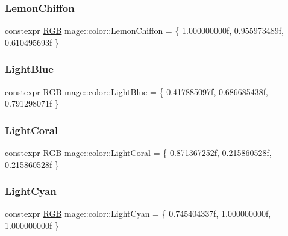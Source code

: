 \subsubsection{\texorpdfstring{Lemon\+Chiffon}{LemonChiffon}}
{\footnotesize\ttfamily constexpr \hyperlink{structmage_1_1_r_g_b}{R\+GB} mage\+::color\+::\+Lemon\+Chiffon = \{ 1.\+000000000f, 0.\+955973489f, 0.\+610495693f \}}

\hypertarget{namespacemage_1_1color_a1890b43e1d4774c83e7cf5a4dcbf9c65}{}\label{namespacemage_1_1color_a1890b43e1d4774c83e7cf5a4dcbf9c65} 
\subsubsection{\texorpdfstring{Light\+Blue}{LightBlue}}
{\footnotesize\ttfamily constexpr \hyperlink{structmage_1_1_r_g_b}{R\+GB} mage\+::color\+::\+Light\+Blue = \{ 0.\+417885097f, 0.\+686685438f, 0.\+791298071f \}}

\hypertarget{namespacemage_1_1color_ad8d2691e5afda566e2310392eff4d591}{}\label{namespacemage_1_1color_ad8d2691e5afda566e2310392eff4d591} 
\subsubsection{\texorpdfstring{Light\+Coral}{LightCoral}}
{\footnotesize\ttfamily constexpr \hyperlink{structmage_1_1_r_g_b}{R\+GB} mage\+::color\+::\+Light\+Coral = \{ 0.\+871367252f, 0.\+215860528f, 0.\+215860528f \}}

\hypertarget{namespacemage_1_1color_a33ec927401f051a6271841f78e67564f}{}\label{namespacemage_1_1color_a33ec927401f051a6271841f78e67564f} 
\subsubsection{\texorpdfstring{Light\+Cyan}{LightCyan}}
{\footnotesize\ttfamily constexpr \hyperlink{structmage_1_1_r_g_b}{R\+GB} mage\+::color\+::\+Light\+Cyan = \{ 0.\+745404337f, 1.\+000000000f, 1.\+000000000f \}}

\hypertarget{namespacemage_1_1color_a60013d7d47356017384ab70bf9a6e1ac}{}\label{namespacemage_1_1color_a60013d7d47356017384ab70bf9a6e1ac} 
